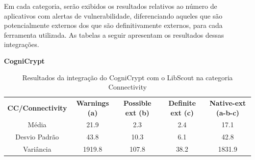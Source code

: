 Em cada categoria, serão exibidos os resultados relativos ao número de aplicativos com alertas de vulnerabilidade, diferenciando aqueles que são potencialmente externos dos que são definitivamente externos, para cada ferramenta utilizada. As tabelas a seguir apresentam os resultados dessas integrações.

\textbf{CogniCrypt}

\begin{table}[!htbp]
  \centering
  \small
  \begin{tabular}{|c|c|c|c|c|}
  
\textbf{CC/Connectivity}   & \textbf{Warnings (a)}   &  \textbf{Possible ext (b)}     &  \textbf{Definite ext (c)} &  \textbf{Native-ext (a-b-c)} \\ 
Média                      & \num{21.9}              &  \num{2.3}                                         & \num{2.4}                                        & \num{17.1}                                                    \\
Desvio Padrão              & \num{43.8}              &  \num{10.3}                                         & \num{6.1}                                        & \num{42.8}                                 \\                    
Variância                  & \num{1919.8}            &  \num{107.8}                                         & \num{38.2}                                       & \num{1831.9}         \\                                           
\end{tabular}
    
  \caption{Resultados da integração do CogniCrypt com o LibScout na categoria Connectivity}
\label{table: AplicativosComWarningCCC}
\end{table}



